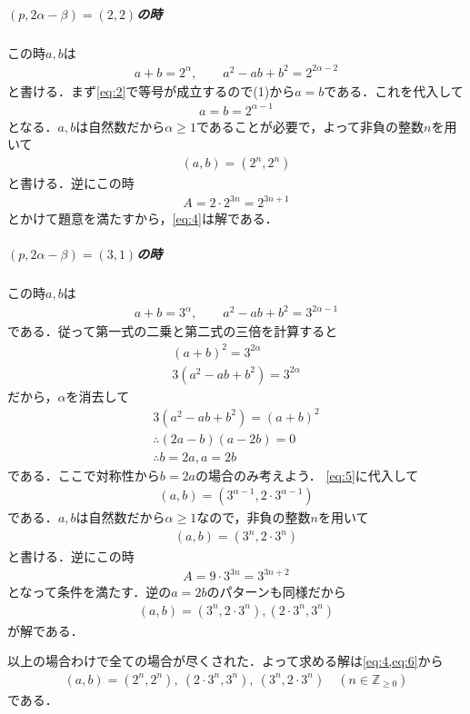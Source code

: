 \documentclass[../../main.tex]{subfiles}
\begin{document}
\subparagraph{$(p,2\alpha-\beta)=(2,2)$の時}

この時$a,b$は
\begin{align}
  a+b=2^\alpha, \qquad a^2-ab+b^2=2^{2\alpha-2}
\end{align}
と書ける．まず\cref{eq:2}で等号が成立するので(1)から$a=b$である．これを代入して
\begin{align}
  a=b=2^{\alpha-1}
\end{align}
となる．$a,b$は自然数だから$\alpha\ge 1$であることが必要で，よって非負の整数$n$を用いて
\begin{align}
  (a,b) = (2^n,2^n) \label{eq:4}
\end{align}
と書ける．逆にこの時
\begin{align}
  A = 2\cdot 2^{3n} = 2^{3n+1}
\end{align}
とかけて題意を満たすから，\cref{eq:4}は解である．

\subparagraph{$(p,2\alpha-\beta)=(3,1)$の時}

この時$a,b$は
\begin{align}
  a+b=3^\alpha, \qquad a^2-ab+b^2=3^{2\alpha-1} \label{eq:5}
\end{align}
である．従って第一式の二乗と第二式の三倍を計算すると
\begin{align}
  (a+b)^2 = 3^{2\alpha} \\
  3(a^2-ab+b^2) = 3^{2\alpha}
\end{align}
だから，$\alpha$を消去して
\begin{align}
  3(a^2-ab+b^2) = (a+b)^2 \\
  \therefore
  (2a-b)(a-2b) = 0 \\
  \therefore
  b=2a, a=2b
\end{align}
である．ここで対称性から$b=2a$の場合のみ考えよう．
\cref{eq:5}に代入して
\begin{align}
  (a,b)=\left(3^{\alpha-1},2\cdot 3^{\alpha-1}\right)
\end{align}
である．$a,b$は自然数だから$\alpha\ge 1$なので，非負の整数$n$を用いて
\begin{align}
  (a,b)=\left(3^n,2\cdot 3^n\right)
\end{align}
と書ける．逆にこの時
\begin{align}
  A = 9\cdot 3^{3n} = 3^{3n+2}
\end{align}
となって条件を満たす．逆の$a=2b$のパターンも同様だから
\begin{align}
  (a,b)=\left(3^n,2\cdot 3^n\right), \left(2\cdot3^n,3^n\right) \label{eq:6}
\end{align}
が解である．
\casesend

以上の場合わけで全ての場合が尽くされた．よって求める解は\cref{eq:4,eq:6}から
\begin{align}
  (a,b)=(2^n,2^n),\ (2\cdot3^n,3^n),\ (3^n,2\cdot3^n)\quad(n\in\mathbb{Z}_{\ge0})
\end{align}
である．

\newpage
\end{document}
